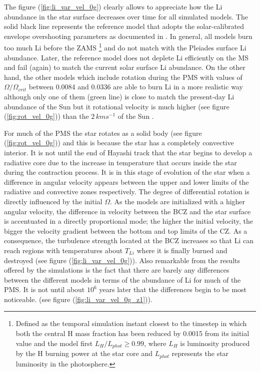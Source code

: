 \documentclass[fleqn,usenatbib]{mnras}
\begin{document}
The figure (\ref{fig:li_var_vel_0g}) clearly allows to appreciate how the Li abundance in the star surface decreases over time for all simulated models. The solid black line represents the reference model that adopts the solar-calibrated envelope overshooting parameters as documented in \citet{Choi2016}. In general, all models burn too much Li before the ZAMS \footnote{Defined as the temporal simulation instant closest to the timestep in which both the central H mass fraction has been reduced by 0.0015 from its initial value and the model first $L_H/L_{phot} \geq 0.99$, where $L_{H}$ is luminosity produced by the H burning power at the star core and $L_{phot}$ represents the star luminosity in the photosphere.} and do not match with the Pleiades surface Li abundance. Later, the reference model does not deplete Li efficiently on the MS and fail (again) to match the current solar surface Li abundance. On the other hand, the other models which include rotation during the PMS with values of $\Omega / \Omega_{crit}$ between 0.0084 and 0.0336 are able to burn Li in a more realistic way although only one of them (green line) is close to match the present-day Li abundance of the Sun but it rotational velocity is much higher (see figure (\ref{fig:rot_vel_0g})) than the $2\,kms^{-1}$ of the Sun \citep{Gill2012}. \par

For much of the PMS the star rotates as a solid body (see figure (\ref{fig:rot_vel_0g})) and this is because the star has a completely convective interior. It is not until the end of Hayashi track that the star begins to develop a radiative core due to the increase in temperature that occurs inside the star during the contraction process. It is in this stage of evolution of the star when a difference in angular velocity appears between the upper and lower limits of the radiative and convective zones respectively. The degree of differential rotation is directly influenced by the initial $\Omega$. As the models are initialized with a higher angular velocity, the difference in velocity between the BCZ and the star surface is accentuated in a directly proportional mode; the higher the initial velocity, the bigger the velocity gradient between the bottom and top limits of the CZ. As a consequence, the turbulence strength located at the BCZ increases so that Li can reach regions with temperatures about $T_{Li}$ where it is finally burned and destroyed (see figure (\ref{fig:li_var_vel_0g})). Also remarkable from the results offered by the simulations is the fact that there are barely any differences between the different models in terms of the abundance of Li for much of the PMS. It is not until about $10^6$ years later that the differences begin to be most noticeable. (see figure (\ref{fig:li_var_vel_0g_z1})).\par
\end{document}
